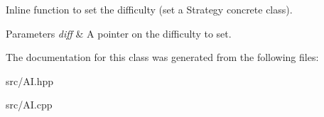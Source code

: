 Inline function to set the difficulty (set a Strategy concrete class). 


\begin{DoxyParams}{Parameters}
{\em diff} & A pointer on the difficulty to set. \\
\hline
\end{DoxyParams}


The documentation for this class was generated from the following files\-:\begin{DoxyCompactItemize}
\item 
src/A\-I.\-hpp\item 
src/A\-I.\-cpp\end{DoxyCompactItemize}

